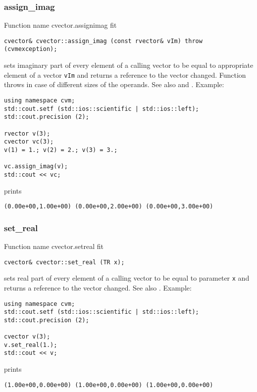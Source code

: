 \subsubsection{assign\_imag}
Function%
\pdfdest name {cvector.assignimag} fit
\begin{verbatim}
cvector& cvector::assign_imag (const rvector& vIm) throw (cvmexception);
\end{verbatim}
sets imaginary part of every element of a calling vector to be equal to
appropriate element of a vector \verb"vIm"
and returns a reference to
the vector changed.
Function throws  
in case of different sizes of the operands.
See also  and .
Example:
\begin{Verbatim}
using namespace cvm;
std::cout.setf (std::ios::scientific | std::ios::left);
std::cout.precision (2);

rvector v(3);
cvector vc(3);
v(1) = 1.; v(2) = 2.; v(3) = 3.;

vc.assign_imag(v);
std::cout << vc;
\end{Verbatim}
prints
\begin{Verbatim}
(0.00e+00,1.00e+00) (0.00e+00,2.00e+00) (0.00e+00,3.00e+00)
\end{Verbatim}
\newpage


\subsubsection{set\_real}
Function%
\pdfdest name {cvector.setreal} fit
\begin{verbatim}
cvector& cvector::set_real (TR x);
\end{verbatim}
sets real part of every element of a calling vector to be equal to
parameter \verb"x"
and returns a reference to the vector changed.
See also .
Example:
\begin{Verbatim}
using namespace cvm;
std::cout.setf (std::ios::scientific | std::ios::left);
std::cout.precision (2);

cvector v(3);
v.set_real(1.);
std::cout << v;
\end{Verbatim}
prints
\begin{Verbatim}
(1.00e+00,0.00e+00) (1.00e+00,0.00e+00) (1.00e+00,0.00e+00)
\end{Verbatim}
\newpage



